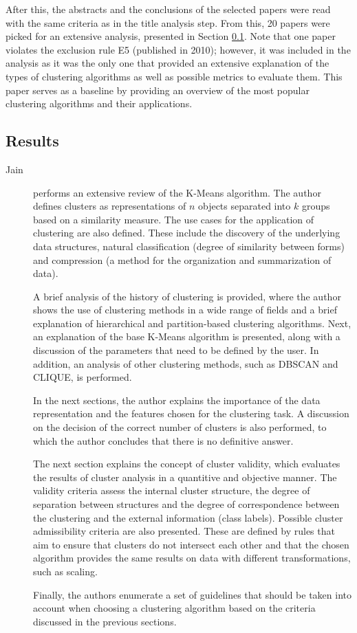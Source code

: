 After this, the abstracts and the conclusions of the selected papers were read with the same criteria as in the title analysis step. From this, 20 papers were picked for an extensive analysis, presented in Section \ref{sec:clustering_sota_results}. Note that one paper violates the exclusion rule E5 (published in 2010); however, it was included in the analysis as it was the only one that provided an extensive explanation of the types of clustering algorithms as well as possible metrics to evaluate them. This paper serves as a baseline by providing an overview of the most popular clustering algorithms and their applications. 


\subsection{Results}\label{sec:clustering_sota_results}
\begin{description}
    \item[Jain]\cite{Jain_Dataclustering50_2010} performs an extensive review of the K-Means algorithm. The author defines clusters as representations of $n$ objects separated into $k$ groups based on a similarity measure. The use cases for the application of clustering are also defined. These include the discovery of the underlying data structures, natural classification (degree of similarity between forms) and compression (a method for the organization and summarization of data).
    
    A brief analysis of the history of clustering is provided, where the author shows the use of clustering methods in a wide range of fields and a brief explanation of hierarchical and partition-based clustering algorithms. Next, an explanation of the base K-Means algorithm is presented, along with a discussion of the parameters that need to be defined by the user. In addition, an analysis of other clustering methods, such as DBSCAN and CLIQUE, is performed. 

    In the next sections, the author explains the importance of the data representation and the features chosen for the clustering task. A discussion on the decision of the correct number of clusters is also performed, to which the author concludes that there is no definitive answer.

    The next section explains the concept of cluster validity, which evaluates the results of cluster analysis in a quantitive and objective manner. The validity criteria assess the internal cluster structure, the degree of separation between structures and the degree of correspondence between the clustering and the external information (class labels). Possible cluster admissibility criteria are also presented. These are defined by rules that aim to ensure that clusters do not intersect each other and that the chosen algorithm provides the same results on data with different transformations, such as scaling.
    
    Finally, the authors enumerate a set of guidelines that should be taken into account when choosing a clustering algorithm based on the criteria discussed in the previous sections.
\end{description}

